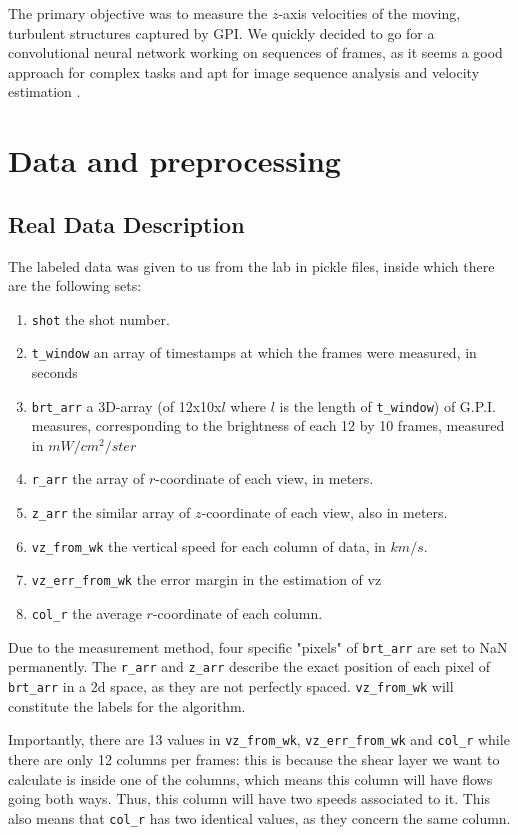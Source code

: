 \documentclass[10pt,conference]{IEEEtran}
\begin{document}
The primary objective was to measure the $z$-axis velocities of the moving, turbulent structures captured by GPI. We quickly decided to go for a convolutional neural network working on sequences of frames, as it seems a good approach for complex tasks and apt for image sequence analysis and velocity estimation \cite{velocitycnn}.

 

\section{Data and preprocessing}

\subsection{Real Data Description}
The labeled data was given to us from the lab in pickle files, inside which there are the following sets:
\begin{enumerate}
  \item \texttt{shot} the shot number.
  \item \texttt{t\_window} an array of timestamps at which the frames were measured, in seconds
  \item \texttt{brt\_arr} a 3D-array (of 12x10x$l$ where $l$ is the length of \texttt{t\_window}) of G.P.I. measures, corresponding to the brightness of each 12 by 10 frames, measured in $mW/cm^2/ster$
  \item \texttt{r\_arr} the array of $r$-coordinate of each view, in meters.
  \item \texttt{z\_arr} the similar array of $z$-coordinate of each view, also in meters.
  \item \texttt{vz\_from\_wk} the vertical speed for each column of data, in $km/s$.
  \item \texttt{vz\_err\_from\_wk} the error margin in the estimation of vz
  \item \texttt{col\_r} the average $r$-coordinate of each column.
\end{enumerate}
Due to the measurement method, four specific "pixels" of \texttt{brt\_arr} are set to NaN permanently. The \texttt{r\_arr} and \texttt{z\_arr} describe the exact position of each pixel of \texttt{brt\_arr} in a 2d space, as they are not perfectly spaced. \texttt{vz\_from\_wk} will constitute the labels for the algorithm.\par
Importantly, there are 13 values in \texttt{vz\_from\_wk}, \texttt{vz\_err\_from\_wk} and \texttt{col\_r} while there are only 12 columns per frames: this is because the shear layer we want to calculate is inside one of the columns, which means this column will have flows going both ways. Thus, this column will have two speeds associated to it. This also means that \texttt{col\_r} has two identical values, as they concern the same column.\par
\end{document}
